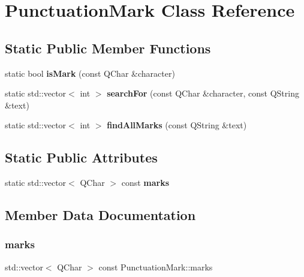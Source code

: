 \hypertarget{class_punctuation_mark}{}\section{Punctuation\+Mark Class Reference}
\label{class_punctuation_mark}
\subsection*{Static Public Member Functions}
\begin{DoxyCompactItemize}
\item 
\mbox{\label{class_punctuation_mark_a9187b76bb5dace6dd599fa4dc15768f2}} 
static bool {\bfseries is\+Mark} (const Q\+Char \&character)
\item 
\mbox{\label{class_punctuation_mark_a2b3ae49bce26a7ed4db8130a8a99d7ee}} 
static std\+::vector$<$ int $>$ {\bfseries search\+For} (const Q\+Char \&character, const Q\+String \&text)
\item 
\mbox{\label{class_punctuation_mark_a489c982ca68807c6df4e2d14f1f1a2b1}} 
static std\+::vector$<$ int $>$ {\bfseries find\+All\+Marks} (const Q\+String \&text)
\end{DoxyCompactItemize}
\subsection*{Static Public Attributes}
\begin{DoxyCompactItemize}
\item 
static std\+::vector$<$ Q\+Char $>$ const {\bfseries marks}
\end{DoxyCompactItemize}


\subsection{Member Data Documentation}
\mbox{\label{class_punctuation_mark_a891e84ecbb07f83219650a5ea415dd06}} 
\subsubsection{\texorpdfstring{marks}{marks}}
{\footnotesize\ttfamily std\+::vector$<$ Q\+Char $>$ const Punctuation\+Mark\+::marks\hspace{0.3cm}{\ttfamily [static]}}

